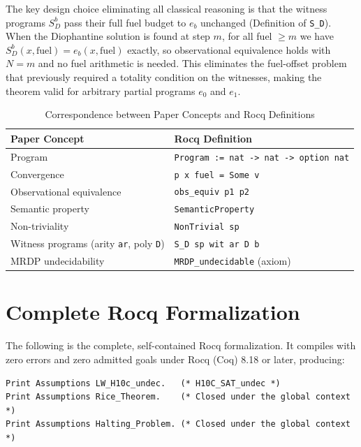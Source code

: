 \documentclass{lmcs}
\begin{document}
The key design choice eliminating all classical reasoning is that the witness
programs $S_D^b$ pass their full fuel budget to $e_b$ unchanged
(Definition of \texttt{S\_D}). When the Diophantine solution is found at
step $m$, for all fuel $\geq m$ we have $S_D^b(x, \text{fuel}) = e_b(x,
\text{fuel})$ exactly, so observational equivalence holds with $N = m$ and
no fuel arithmetic is needed. This eliminates the fuel-offset problem
that previously required a totality condition on the witnesses, making the
theorem valid for arbitrary partial programs $e_0$ and $e_1$.

\begin{table}[h]
\centering
\caption{Correspondence between Paper Concepts and Rocq Definitions}
\label{tab:correspondence}
\begin{tabular}{ll}
\toprule
\textbf{Paper Concept} & \textbf{Rocq Definition} \\
\midrule
Program & \texttt{Program := nat -> nat -> option nat} \\
Convergence & \texttt{p x fuel = Some v} \\
Observational equivalence & \texttt{obs\_equiv p1 p2} \\
Semantic property & \texttt{SemanticProperty} \\
Non-triviality & \texttt{NonTrivial sp} \\
Witness programs (arity \texttt{ar}, poly \texttt{D}) & \texttt{S\_D sp wit ar D b} \\
MRDP undecidability & \texttt{MRDP\_undecidable} (axiom) \\
\bottomrule
\end{tabular}
\end{table}

\appendix

\section{Complete Rocq Formalization}
\label{sec:appendix}

The following is the complete, self-contained Rocq formalization. It compiles with zero errors and zero admitted goals under Rocq (Coq) 8.18 or later, producing:
\begin{verbatim}
Print Assumptions LW_H10c_undec.   (* H10C_SAT_undec *)
Print Assumptions Rice_Theorem.    (* Closed under the global context *)
Print Assumptions Halting_Problem. (* Closed under the global context *)
\end{verbatim}
\end{document}
